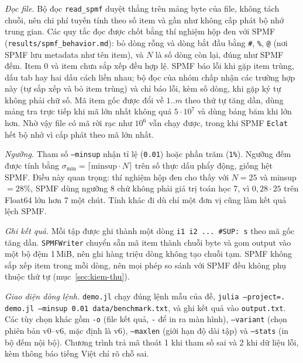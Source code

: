 \emph{Đọc file.} Bộ đọc \texttt{read\_spmf} duyệt thẳng trên mảng byte của file, không tách chuỗi, nên chi phí tuyến tính theo số item và gần như không cấp phát bộ nhớ trung gian. Các quy tắc đọc được chốt bằng thí nghiệm hộp đen với SPMF (\texttt{results/spmf\_behavior.md}): bỏ dòng rỗng và dòng bắt đầu bằng \texttt{\#}, \texttt{\%}, \texttt{@} (nơi SPMF lưu metadata như tên item), và $N$ là số dòng còn lại, đúng như SPMF đếm. Item 0 và item chưa sắp xếp đều hợp lệ. SPMF báo lỗi khi gặp item trùng, dấu tab hay hai dấu cách liền nhau; bộ đọc của nhóm chấp nhận các trường hợp này (tự sắp xếp và bỏ item trùng) và chỉ báo lỗi, kèm số dòng, khi gặp ký tự không phải chữ số. Mã item gốc được đổi về $1..m$ theo thứ tự tăng dần, dùng mảng tra trực tiếp khi mã lớn nhất không quá $5 \cdot 10^7$ và dùng bảng băm khi lớn hơn. Nhờ vậy file có mã rời rạc như $10^6$ vẫn chạy được, trong khi SPMF \texttt{Eclat} hết bộ nhớ vì cấp phát theo mã lớn nhất.

\emph{Ngưỡng.} Tham số \texttt{--minsup} nhận tỉ lệ (\texttt{0.01}) hoặc phần trăm (\texttt{1\%}). Ngưỡng đếm được tính bằng $\sigma_{\min} = \lceil \mathrm{minsup} \cdot N \rceil$ trên số thực dấu phẩy động, giống hệt SPMF. Điều này quan trọng: thí nghiệm hộp đen cho thấy với $N = 25$ và minsup $= 28\%$, SPMF dùng ngưỡng 8 chứ không phải giá trị toán học 7, vì $0{,}28 \cdot 25$ trên Float64 lớn hơn 7 một chút. Tính khác đi dù chỉ một đơn vị cũng làm kết quả lệch SPMF.

\emph{Ghi kết quả.} Mỗi tập được ghi thành một dòng \texttt{i1 i2 ... \#SUP: s} theo mã gốc tăng dần. \texttt{SPMFWriter} chuyển sẵn mã item thành chuỗi byte và gom output vào một bộ đệm 1\,MiB, nên ghi hàng triệu dòng không tạo chuỗi tạm. SPMF không sắp xếp item trong mỗi dòng, nên mọi phép so sánh với SPMF đều không phụ thuộc thứ tự (mục~\ref{sec:kiem-thu}).

\emph{Giao diện dòng lệnh.} \texttt{demo.jl} chạy đúng lệnh mẫu của đề, \texttt{julia --project=. demo.jl --minsup 0.01 data/benchmark.txt}, và ghi kết quả vào \texttt{output.txt}. Các tùy chọn khác gồm \texttt{-o} (file kết quả, \texttt{-} để in ra màn hình), \texttt{--variant} (chọn phiên bản v0--v6, mặc định là v6), \texttt{--maxlen} (giới hạn độ dài tập) và \texttt{--stats} (in bộ đếm nội bộ). Chương trình trả mã thoát 1 khi tham số sai và 2 khi dữ liệu lỗi, kèm thông báo tiếng Việt chỉ rõ chỗ sai.
